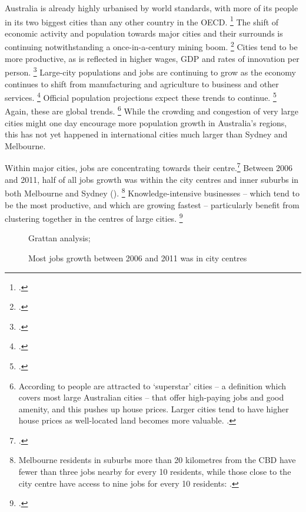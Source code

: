 \label{paragraph:cities-increase-incomes}
Australia is already highly urbanised by world standards, with more of its people in its two biggest cities than any other country in the OECD.%
    \footcite{OECD2014OECDFactbook2014}
The shift of economic activity and population towards major cities and their surrounds is continuing notwithstanding a once-in-a-century mining boom.%
    \footcite{DaleyWoodChivers2017RegPatterns}
Cities tend to be more productive, as is reflected in higher wages, GDP and rates of innovation per person.%
    \footcite{Romer-cities}
Large-city populations and jobs are continuing to grow as the economy continues to shift from manufacturing and agriculture to business and other services.%
    \footcite{Daley-productivity-geography}
Official population projections expect these trends to continue.%
    \footcites{ABS2013PopulationprojectionsAustralia}[][21]{IA_2018_Future_cities}
Again, these are global trends.%
	\footnote{According to \textcite{SuperstarCities} people are attracted to `superstar' cities -- a definition which covers most large Australian cities -- that offer high-paying jobs and good amenity, and this pushes up house prices. Larger cities tend to have higher house prices as well-located land becomes more valuable. \textcite{EllisAndrewsRBA2001}.}
While the crowding and congestion of very large cities might one day encourage more population growth in Australia's regions, this has not yet happened in international cities much larger than Sydney and Melbourne.

Within major cities, jobs are concentrating towards their centre.\footcites{Jackson_2018_id_where_are_the_jobs}{SGS2017jobscities}
Between 2006 and 2011, half of all jobs growth was  within the city centres and inner suburbs in both Melbourne and Sydney ().%
	\footnote{Melbourne residents in suburbs more than 20 kilometres from the CBD have fewer than three jobs nearby for every 10 residents, while those close to the city centre have access to nine jobs for every 10 residents: \textcite{KellyDonegan2015-City-limits}.}
Knowledge-intensive businesses -- which tend to be the most productive, and which are growing fastest -- particularly benefit from clustering together in the centres of large cities.%
	\footcite[][23--29]{KellyDonegan2015-City-limits}

\begin{figure}
\caption{Most jobs growth between 2006 and 2011 was in city centres}\label{fig:jobs-growth-cbds}
{Grattan analysis; \textcite{BITRE14-15}}
\end{figure}

